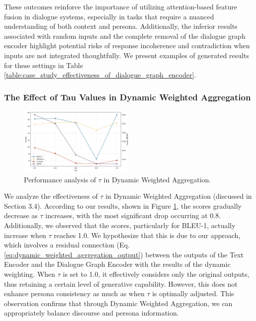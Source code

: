 \documentclass[letterpaper]{article} %
\begin{document}
These outcomes reinforce the importance of utilizing attention-based feature fusion in dialogue systems, especially in tasks that require a nuanced understanding of both context and persona. Additionally, the inferior results associated with random inputs and the complete removal of the dialogue graph encoder highlight potential risks of response incoherence and contradiction when inputs are not integrated thoughtfully. We present examples of generated results for these settings in Table \ref{table:case_study_effectiveness_of_dialogue_graph_encoder}.

\subsubsection{The Effect of Tau Values in Dynamic Weighted Aggregation}

\begin{figure}[hb]
    \centering
    \includegraphics[width=0.5\textwidth]{./images/effectiveness_of_tau_with_deam.png}
    \caption{Performance analysis of $\tau$ in Dynamic Weighted Aggregation.}
    \label{fig:effectiveness_of_tau}
\end{figure}

We analyze the effectiveness of $\tau$ in Dynamic Weighted Aggregation (discussed in Section 3.4). According to our results, shown in Figure \ref{fig:effectiveness_of_tau}, the scores gradually decrease as $\tau$ increases, with the most significant drop occurring at 0.8. Additionally, we observed that the scores, particularly for BLEU-1, actually increase when $\tau$ reaches 1.0. We hypothesize that this is due to our approach, which involves a residual connection (Eq. \ref{eq:dynamic_weighted_aggregation_output}) between the outputs of the Text Encoder and the Dialogue Graph Encoder with the results of the dynamic weighting. When $\tau$ is set to 1.0, it effectively considers only the original outputs, thus retaining a certain level of generative capability. However, this does not enhance persona consistency as much as when $\tau$ is optimally adjusted. This observation confirms that through Dynamic Weighted Aggregation, we can appropriately balance discourse and persona information.
\end{document}
